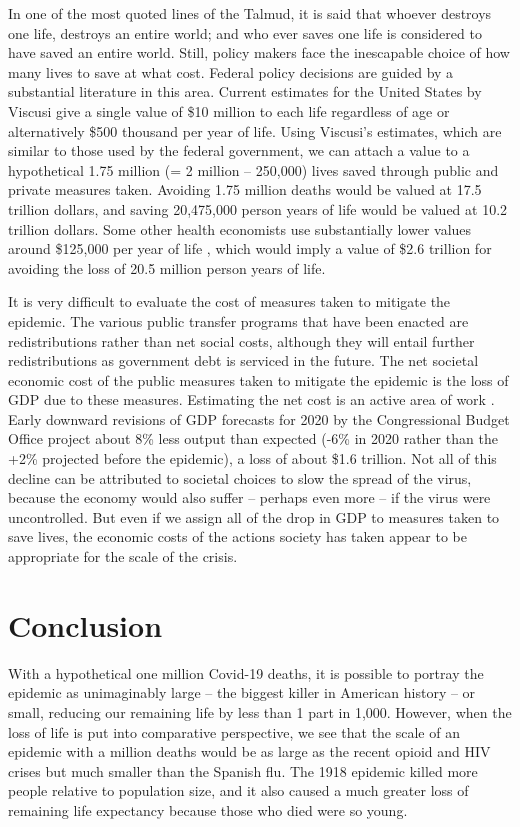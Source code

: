 \documentclass[9pt,twocolumn,twoside,lineno]{pnas-new}
\begin{document}
In one of the most quoted lines of the Talmud, it is said that whoever
destroys one life, destroys an entire world; and who ever saves one
life is considered to have saved an entire world. Still, policy makers
face the inescapable choice of how many lives to save at what
cost. Federal policy decisions are guided by a substantial literature
in this area. Current estimates for the United States by Viscusi
\cite{viscusi:2018,viscusi:2020} give a single value of \$10 million
to each life regardless of age or alternatively \$500 thousand per
year of life. Using Viscusi’s estimates, which are similar to those
used by the federal government, we can attach a value to a
hypothetical 1.75 million (= 2 million – 250,000) lives saved through
public and private measures taken. Avoiding 1.75 million deaths would
be valued at 17.5 trillion dollars, and saving 20,475,000 person years
of life would be valued at 10.2 trillion dollars. Some other health
economists use substantially lower values around \$125,000 per year of
life \cite{ICER:2020}, which would imply a value of \$2.6 trillion for
avoiding the loss of 20.5 million person years of life.

It is very difficult to evaluate the cost of measures taken to
mitigate the epidemic. The various public transfer programs that have
been enacted are redistributions rather than net social costs,
although they will entail further redistributions as government debt
is serviced in the future. The net societal economic cost of the
public measures taken to mitigate the epidemic is the loss of GDP due
to these measures. Estimating the net cost is an active area of work
\cite{correia:2020,eichenbaum:2020}. Early downward revisions of GDP
forecasts for 2020 by the Congressional Budget Office \cite{cbo:2020}
project about 8\%  less output
than expected (-6\% in 2020 rather than the +2\% projected before
the epidemic), a loss of about \$1.6 trillion. Not all of this decline can be
attributed to societal choices to slow the spread of the virus,
because the economy would also suffer -- perhaps even more -- if the
virus were uncontrolled. But even if we assign all of the drop in GDP
to measures taken to save lives, the economic costs of the actions
society has taken appear to be appropriate for the scale of the
crisis.

\section*{Conclusion}

With a hypothetical one million Covid-19 deaths, it is possible to
portray the epidemic as unimaginably large -- the biggest killer in
American history -- or small, reducing our remaining life
by less than 1 part in 1,000. However, when the loss of
life is put into comparative perspective, we see that the scale of an
epidemic with a million deaths would be as large as the recent opioid
and HIV crises but much smaller than the Spanish flu. The 1918
epidemic killed more people relative to population size, and it also
caused a much greater loss of remaining life expectancy because those
who died were so young.
\end{document}
